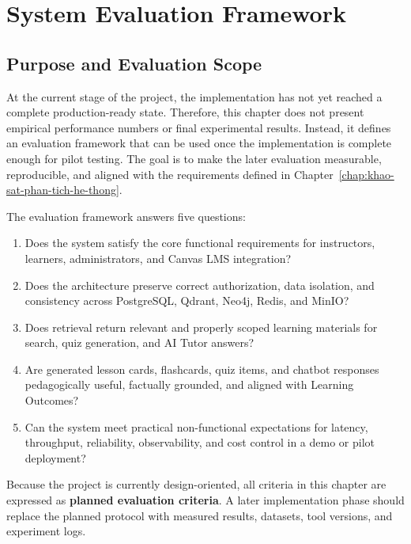 \chapter{System Evaluation Framework}
\label{chap:system-evaluation}

\section{Purpose and Evaluation Scope}

At the current stage of the project, the implementation has not yet reached
a complete production-ready state. Therefore, this chapter does not present
empirical performance numbers or final experimental results. Instead, it
defines an evaluation framework that can be used once the implementation is
complete enough for pilot testing. The goal is to make the later evaluation
measurable, reproducible, and aligned with the requirements defined in
Chapter~\ref{chap:khao-sat-phan-tich-he-thong}.

The evaluation framework answers five questions:

\begin{enumerate}
    \item Does the system satisfy the core functional requirements for
          instructors, learners, administrators, and Canvas LMS integration?
    \item Does the architecture preserve correct authorization, data
          isolation, and consistency across PostgreSQL, Qdrant, Neo4j, Redis,
          and MinIO?
    \item Does retrieval return relevant and properly scoped learning
          materials for search, quiz generation, and AI Tutor answers?
    \item Are generated lesson cards, flashcards, quiz items, and chatbot
          responses pedagogically useful, factually grounded, and aligned with
          Learning Outcomes?
    \item Can the system meet practical non-functional expectations for
          latency, throughput, reliability, observability, and cost control in
          a demo or pilot deployment?
\end{enumerate}

Because the project is currently design-oriented, all criteria in this chapter
are expressed as \textbf{planned evaluation criteria}. A later implementation
phase should replace the planned protocol with measured results, datasets,
tool versions, and experiment logs.


